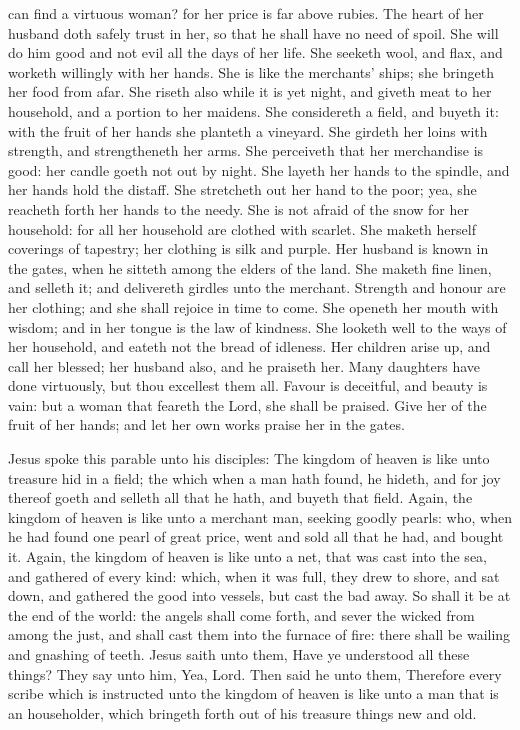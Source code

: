  can find a virtuous woman? for her price is far above rubies. The heart of her husband doth safely trust in her, so that he shall have no need of spoil. She will do him good and not evil all the days of her life. She seeketh wool, and flax, and worketh willingly with her hands. She is like the merchants’ ships; she bringeth her food from afar. She riseth also while it is yet night, and giveth meat to her household, and a portion to her maidens. She considereth a field, and buyeth it: with the fruit of her hands she planteth a vineyard. She girdeth her loins with strength, and strengtheneth her arms. She perceiveth that her merchandise is good: her candle goeth not out by night. She layeth her hands to the spindle, and her hands hold the distaff. She stretcheth out her hand to the poor; yea, she reacheth forth her hands to the needy. She is not afraid of the snow for her household: for all her household are clothed with scarlet. She maketh herself coverings of tapestry; her clothing is silk and purple. Her husband is known in the gates, when he sitteth among the elders of the land. She maketh fine linen, and selleth it; and delivereth girdles unto the merchant. Strength and honour are her clothing; and she shall rejoice in time to come. She openeth her mouth with wisdom; and in her tongue is the law of kindness. She looketh well to the ways of her household, and eateth not the bread of idleness. Her children arise up, and call her blessed; her husband also, and he praiseth her. Many daughters have done virtuously, but thou excellest them all. Favour is deceitful, and beauty is vain: but a woman that feareth the Lord, she shall be praised. Give her of the fruit of her hands; and let her own works praise her in the gates.


 Jesus spoke this parable unto his disciples: The kingdom of heaven is like unto treasure hid in a field; the which when a man hath found, he hideth, and for joy thereof goeth and selleth all that he hath, and buyeth that field. Again, the kingdom of heaven is like unto a merchant man, seeking goodly pearls: who, when he had found one pearl of great price, went and sold all that he had, and bought it. Again, the kingdom of heaven is like unto a net, that was cast into the sea, and gathered of every kind: which, when it was full, they drew to shore, and sat down, and gathered the good into vessels, but cast the bad away. So shall it be at the end of the world: the angels shall come forth, and sever the wicked from among the just, and shall cast them into the furnace of fire: there shall be wailing and gnashing of teeth. Jesus saith unto them, Have ye understood all these things? They say unto him, Yea, Lord. Then said he unto them, Therefore every scribe which is instructed unto the kingdom of heaven is like unto a man that is an householder, which bringeth forth out of his treasure things new and old.

